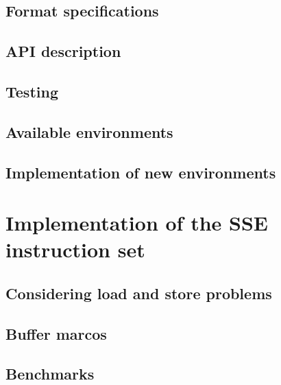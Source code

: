     \section{Format specifications}

      

    \section{API description} 

    \section{Testing} 

    \section{Available environments} 

    \section{Implementation of new environments} 

\chapter{Implementation of the SSE instruction set}
    \label{ch:sse}

    

    \section{Considering load and store problems}  

    \section{Buffer marcos} 

    \section{Benchmarks} 
      

%
%

